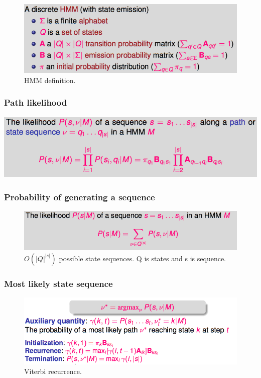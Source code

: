 \begin{figure}[htp]
	\centering
	\includegraphics[scale=0.5]{images/23_ex1.png}
	\caption{HMM definition.}
\end{figure}
\newpage
\subsubsection{Path likelihood}

\begin{center}
	\includegraphics[scale=0.5]{images/25_path.png}
\end{center}

\subsubsection{Probability of generating a sequence}

\begin{figure}[htp]
	\centering
	\includegraphics[scale=0.5]{images/26_seq.png}
	\caption{$O(|Q|^{|s|})$ possible state sequences. Q is states and s is sequence.}
\end{figure}

\newpage
\subsubsection{Most likely state sequence}

\begin{figure}[htp]
	\centering
	\includegraphics[scale=0.5]{images/27_viterbi.png}
	\caption{Viterbi recurrence.}
\end{figure}

